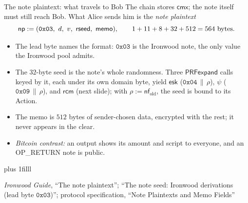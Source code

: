 \documentclass[aspectratio=169,11pt]{beamer}
\newcommand{\nfsym}{\ensuremath{\mathsf{nf}}}
\newcommand{\cmx}{\ensuremath{\mathsf{cmx}}}
\newcommand{\rcm}{\ensuremath{\mathsf{rcm}}}
\newcommand{\esk}{\ensuremath{\mathsf{esk}}}
\newcommand{\src}[1]{\par\vskip0pt plus 1filll
  {\fontsize{6}{7.2}\selectfont\color{arbdim}\raggedright #1\par}}
\begin{document}
\begin{frame}{The note plaintext: what travels to Bob}
The chain stores \cmx; the note itself must still reach Bob. What Alice
sends him is the \emph{note plaintext}
\[
\mathsf{np} := (\mathtt{0x03},\ d,\ v,\ \mathsf{rseed},\ \mathsf{memo}),
\qquad 1 + 11 + 8 + 32 + 512 = 564 \text{ bytes.}
\]
\begin{itemize}
  \item The lead byte names the format: $\mathtt{0x03}$ is the Ironwood
    note, the only value the Ironwood pool admits.
  \item The $32$-byte seed \Frseed{} is the note's whole randomness. Three
    $\mathsf{PRFexpand}$ calls keyed by it, each under its own domain
    byte, yield \esk{} ($\mathtt{0x04} \,\|\, \rho$), $\psi$
    ($\mathtt{0x09} \,\|\, \rho$), and \rcm{} (next slide); with
    $\rho := \nfsym_{\mathrm{old}}$, the seed is bound to its Action.
  \item The memo is $512$ bytes of sender-chosen data, encrypted with the
    rest; it never appears in the clear.
  \item \emph{Bitcoin contrast:} an output shows its amount and script to
    everyone, and an OP\_RETURN note is public.
\end{itemize}
\src{\emph{Ironwood Guide}, ``The note plaintext''; ``The note seed: Ironwood
  derivations (lead byte $\mathtt{0x03}$)''; protocol specification, ``Note
  Plaintexts and Memo Fields''}
\end{frame}
\end{document}
